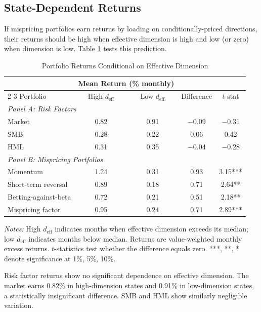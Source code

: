 \documentclass[12pt,letterpaper]{article}
\theoremstyle{plain}
\theoremstyle{definition}
\newcommand{\deff}{d_{\text{eff}}}
\begin{document}
\subsection{State-Dependent Returns}\label{subsec:state_returns}

If mispricing portfolios earn returns by loading on conditionally-priced directions, their returns should be high when effective dimension is high and low (or zero) when dimension is low. Table \ref{tab:state_returns} tests this prediction.

\begin{table}[htbp]
\centering
\caption{Portfolio Returns Conditional on Effective Dimension}
\label{tab:state_returns}
\begin{tabular}{lcccc}
\toprule
& \multicolumn{2}{c}{Mean Return (\% monthly)} & & \\
\cmidrule(lr){2-3}
Portfolio & High $\deff$ & Low $\deff$ & Difference & $t$-stat \\
\midrule
\multicolumn{5}{l}{\textit{Panel A: Risk Factors}} \\
Market & 0.82 & 0.91 & $-$0.09 & $-$0.31 \\
SMB & 0.28 & 0.22 & 0.06 & 0.42 \\
HML & 0.31 & 0.35 & $-$0.04 & $-$0.28 \\
\midrule
\multicolumn{5}{l}{\textit{Panel B: Mispricing Portfolios}} \\
Momentum & 1.24 & 0.31 & 0.93 & 3.15*** \\
Short-term reversal & 0.89 & 0.18 & 0.71 & 2.64** \\
Betting-against-beta & 0.72 & 0.21 & 0.51 & 2.18** \\
Mispricing factor & 0.95 & 0.24 & 0.71 & 2.89*** \\
\bottomrule
\end{tabular}

\vspace{0.5em}
\footnotesize
\textit{Notes:} High $\deff$ indicates months when effective dimension exceeds its median; low $\deff$ indicates months below median. Returns are value-weighted monthly excess returns. $t$-statistics test whether the difference equals zero. ***, **, * denote significance at 1\%, 5\%, 10\%.
\end{table}

Risk factor returns show no significant dependence on effective dimension. The market earns 0.82\% in high-dimension states and 0.91\% in low-dimension states, a statistically insignificant difference. SMB and HML show similarly negligible variation.
\end{document}
